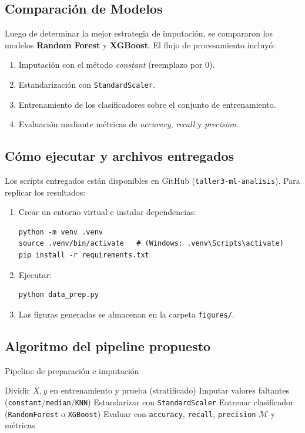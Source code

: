 \documentclass[12pt]{article}
\begin{document}
\subsection{Comparación de Modelos}
Luego de determinar la mejor estrategia de imputación, se compararon los modelos \textbf{Random Forest} y \textbf{XGBoost}.  
El flujo de procesamiento incluyó:
\begin{enumerate}
    \item Imputación con el método \textit{constant} (reemplazo por 0).
    \item Estandarización con \texttt{StandardScaler}.
    \item Entrenamiento de los clasificadores sobre el conjunto de entrenamiento.
    \item Evaluación mediante métricas de \textit{accuracy}, \textit{recall} y \textit{precision}.
\end{enumerate}

\subsection*{Cómo ejecutar y archivos entregados}
Los scripts entregados están disponibles en GitHub (\texttt{taller3-ml-analisis}).  
Para replicar los resultados:
\begin{enumerate}
    \item Crear un entorno virtual e instalar dependencias:
\begin{verbatim}
python -m venv .venv
source .venv/bin/activate   # (Windows: .venv\Scripts\activate)
pip install -r requirements.txt
\end{verbatim}
    \item Ejecutar:
\begin{verbatim}
python data_prep.py
\end{verbatim}
    \item Las figuras generadas se almacenan en la carpeta \texttt{figures/}.
\end{enumerate}

\subsection*{Algoritmo del pipeline propuesto}
\begin{algorithm}[H]
\caption{Pipeline de preparación e imputación}
Dividir $X,y$ en entrenamiento y prueba (stratificado)\;
Imputar valores faltantes (\texttt{constant}/\texttt{median}/\texttt{KNN})\;
Estandarizar con \texttt{StandardScaler}\;
Entrenar clasificador (\texttt{RandomForest} o \texttt{XGBoost})\;
Evaluar con \texttt{accuracy}, \texttt{recall}, \texttt{precision}\;
\Return $\mathcal{M}$ y métricas\;
\end{algorithm}
\end{document}
